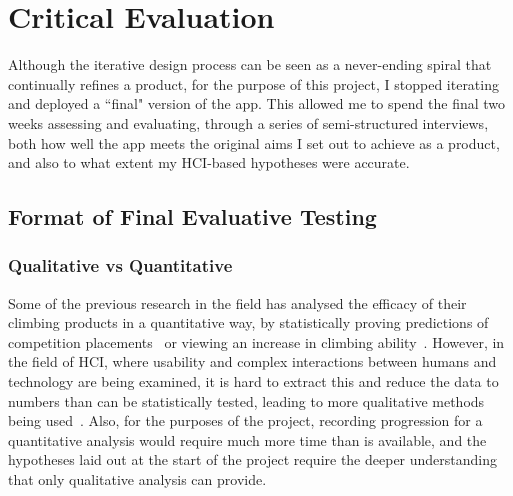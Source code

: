 \chapter{Critical Evaluation}
\label{chap:evaluation}







Although the iterative design process can be seen as a never-ending spiral that continually refines a product, for the purpose of this project, I stopped iterating and deployed a ``final" version of the app.
This allowed me to spend the final two weeks assessing and evaluating, through a series of semi-structured interviews, both how well the app meets the original aims I set out to achieve as a product, and also to what extent my HCI-based hypotheses were accurate.

\section{Format of Final Evaluative Testing}
\subsection{Qualitative vs Quantitative}
Some of the previous research in the field has analysed the efficacy of their climbing products in a quantitative way, by statistically proving predictions of competition placements~\cite{climbaxstudy} or viewing an increase in climbing ability~\cite{climbbsn}. 
However, in the field of HCI, where usability and complex interactions between humans and technology are being examined, it is hard to extract this and reduce the data to numbers than can be statistically tested, leading to more qualitative methods being used~\cite{oro11911}.
Also, for the purposes of the project, recording progression for a quantitative analysis would require much more time than is available, and the hypotheses laid out at the start of the project require the deeper understanding that only qualitative analysis can provide.


